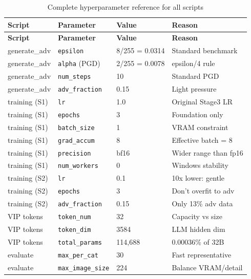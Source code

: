 \documentclass[12pt,a4paper]{article}
\begin{document}
\begin{longtable}{@{}llll@{}}
\caption{Complete hyperparameter reference for all scripts} \\
\toprule
\textbf{Script} & \textbf{Parameter} & \textbf{Value} & \textbf{Reason} \\
\midrule
\endfirsthead
\toprule
\textbf{Script} & \textbf{Parameter} & \textbf{Value} & \textbf{Reason} \\
\midrule
\endhead
generate\_adv & \texttt{epsilon}       & 8/255 = 0.0314 & Standard benchmark \\
generate\_adv & \texttt{alpha} (PGD)  & 2/255 = 0.0078 & epsilon/4 rule \\
generate\_adv & \texttt{num\_steps}   & 10             & Standard PGD \\
generate\_adv & \texttt{adv\_fraction} & 0.15          & Light pressure \\
\midrule
training (S1) & \texttt{lr}           & 1.0            & Original Stage3 LR \\
training (S1) & \texttt{epochs}       & 3              & Foundation only \\
training (S1) & \texttt{batch\_size}  & 1              & VRAM constraint \\
training (S1) & \texttt{grad\_accum}  & 8              & Effective batch = 8 \\
training (S1) & \texttt{precision}    & bf16           & Wider range than fp16 \\
training (S1) & \texttt{num\_workers} & 0              & Windows stability \\
\midrule
training (S2) & \texttt{lr}           & 0.1            & 10x lower: gentle \\
training (S2) & \texttt{epochs}       & 3              & Don't overfit to adv \\
training (S2) & \texttt{adv\_fraction} & 0.15          & Only 13\% adv data \\
\midrule
VIP tokens    & \texttt{token\_num}   & 32             & Capacity vs size \\
VIP tokens    & \texttt{token\_dim}   & 3584           & LLM hidden dim \\
VIP tokens    & \texttt{total\_params} & 114,688       & 0.00036\% of 32B \\
\midrule
evaluate      & \texttt{max\_per\_cat} & 30            & Fast representative \\
evaluate      & \texttt{max\_image\_size} & 224       & Balance VRAM/detail \\
\bottomrule
\end{longtable}
\end{document}
